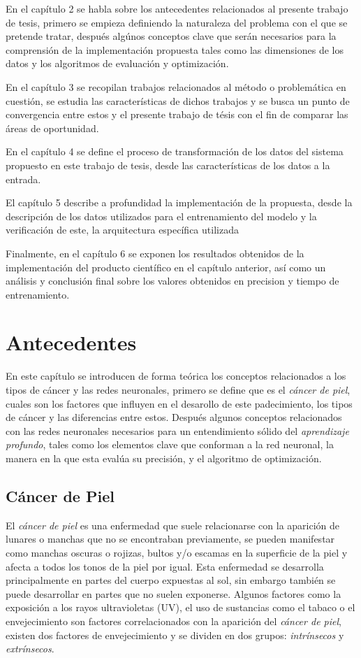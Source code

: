 En el capítulo 2 se habla sobre los antecedentes relacionados al presente trabajo de tesis, primero se empieza definiendo la naturaleza del problema con el que se pretende tratar, después algúnos conceptos clave que serán necesarios para la comprensión de la implementación propuesta tales como las dimensiones de los datos y los algoritmos de evaluación y optimización.

En el capítulo 3 se recopilan trabajos relacionados al método o problemática en cuestión, se estudia las características de dichos trabajos y se busca un punto de convergencia entre estos y el presente trabajo de tésis con el fin de comparar las áreas de oportunidad.

En el capítulo 4 se define el proceso de transformación de los datos del sistema propuesto en este trabajo de tesis, desde las características de los datos a la entrada.

El capítulo 5 describe a profundidad la implementación de la propuesta, desde la descripción de los datos utilizados para el entrenamiento del modelo y la verificación de este, la arquitectura específica utilizada 


Finalmente, en el capítulo 6 se exponen los resultados obtenidos de la implementación del producto científico en el capítulo anterior, así como un análisis y conclusión final sobre los valores obtenidos en precision y tiempo de entrenamiento. 

\chapter{Antecedentes}
En este capítulo se introducen de forma teórica los conceptos relacionados a los tipos de cáncer y las redes neuronales, primero se define que es el \emph{cáncer de piel}, cuales son los factores que influyen en el desarollo de este padecimiento, los tipos de cáncer y las diferencias entre estos. Después algunos conceptos relacionados con las redes neuronales necesarios para un entendimiento sólido del \emph{aprendizaje profundo}, tales como los elementos clave que conforman a la red neuronal, la manera en la que esta evalúa su precisión, y el algoritmo de optimización.

\section{Cáncer de Piel}
El \emph{cáncer de piel} es una enfermedad que suele relacionarse con la aparición de lunares o manchas que no se encontraban previamente, se pueden manifestar como manchas oscuras o rojizas, bultos y/o escamas en la superficie de la piel y afecta a todos los tonos de la piel por igual. Esta enfermedad se desarrolla principalmente en partes del cuerpo expuestas al sol, sin embargo también se puede desarrollar en partes que no suelen exponerse. Algunos factores como la exposición a los rayos ultravioletas (UV), el uso de sustancias como el tabaco o el envejecimiento son factores correlacionados con la aparición del \emph{cáncer de piel}, existen dos factores de envejecimiento y se dividen en dos grupos: \emph{intrínsecos} y \emph{extrínsecos}.

